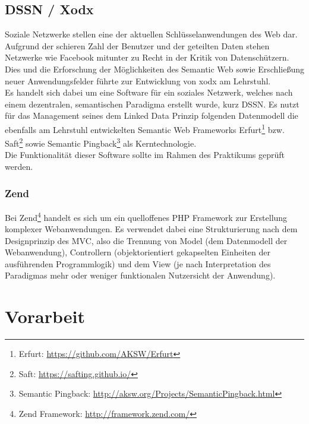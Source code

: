 \documentclass{article}
\begin{document}
\subsection{DSSN / Xodx}

Soziale Netzwerke stellen eine der aktuellen Schlüsselanwendungen des Web dar. Aufgrund der schieren Zahl der Benutzer und der geteilten Daten stehen Netzwerke wie Facebook mitunter zu Recht in der Kritik von Datenschützern. Dies und die Erforschung der Möglichkeiten des Semantic Web sowie Erschließung neuer Anwendungsfelder führte zur Entwicklung von xodx\cite{xodx_paper} am Lehrstuhl.\\
Es handelt sich dabei um eine Software für ein soziales Netzwerk, welches nach einem dezentralen, semantischen Paradigma erstellt wurde, kurz DSSN. Es nutzt für das Management seines dem Linked Data Prinzip folgenden Datenmodell die ebenfalls am Lehrstuhl entwickelten Semantic Web Frameworks Erfurt\footnote{Erfurt: \url{https://github.com/AKSW/Erfurt}} bzw. Saft\footnote{Saft: \url{https://safting.github.io/}} sowie Semantic Pingback\footnote{Semantic Pingback: \url{http://aksw.org/Projects/SemanticPingback.html}} als Kerntechnologie.\\
Die Funktionalität dieser Software sollte im Rahmen des Praktikums geprüft werden.

\subsubsection{Zend}

Bei Zend\footnote{Zend Framework: \url{http://framework.zend.com/}} handelt es sich um ein quelloffenes PHP Framework zur Erstellung komplexer Webanwendungen. Es verwendet dabei eine Strukturierung nach dem Designprinzip des MVC, also die Trennung von Model (dem Datenmodell der Webanwendung), Controllern (objektorientiert gekapselten Einheiten der ausführenden Programmlogik) und dem View (je nach Interpretation des Paradigmas mehr oder weniger funktionalen Nutzersicht der Anwendung).

\section{Vorarbeit}
\end{document}
